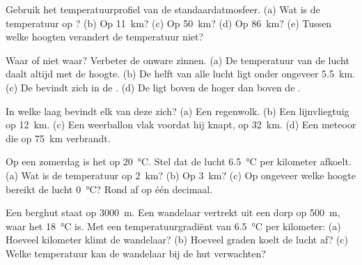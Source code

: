 \begin{exercise}[$\star$]\label{exo:g8:the-atmosphere:2}
Gebruik het temperatuurprofiel van de standaardatmosfeer. (a) Wat is de
temperatuur op ? (b) Op \qty{11}{km}? (c) Op \qty{50}{km}?
(d) Op \qty{86}{km}? (e) Tussen welke hoogten verandert de temperatuur
niet?
\end{exercise}

\begin{exercise}[$\star$]\label{exo:g8:the-atmosphere:3}
Waar of niet waar? Verbeter de onware zinnen. (a) De temperatuur van de
lucht daalt altijd met de hoogte. (b) De helft van alle lucht ligt onder
ongeveer \qty{5.5}{km}. (c) De  bevindt zich in de .
(d) De  ligt boven de  hoger dan boven de .
\end{exercise}

\begin{exercise}[$\star$]\label{exo:g8:the-atmosphere:4}
In welke laag bevindt elk van deze zich? (a) Een regenwolk. (b) Een
lijnvliegtuig op \qty{12}{km}. (c) Een weerballon vlak voordat hij knapt,
op \qty{32}{km}. (d) Een meteoor die op \qty{75}{km} verbrandt.
\end{exercise}

\begin{exercise}[$\star\star$]\label{exo:g8:the-atmosphere:5}
Op een zomerdag is het op  \qty{20}{\degreeCelsius}. Stel dat de
lucht \qty{6.5}{\degreeCelsius} per kilometer afkoelt. (a) Wat is de
temperatuur op \qty{2}{km}? (b) Op \qty{3}{km}? (c) Op ongeveer welke
hoogte bereikt de lucht \qty{0}{\degreeCelsius}? Rond af op één decimaal.
\end{exercise}

\begin{exercise}[$\star\star$]\label{exo:g8:the-atmosphere:6}
Een berghut staat op \qty{3000}{m}. Een wandelaar vertrekt uit een dorp op
\qty{500}{m}, waar het \qty{18}{\degreeCelsius} is. Met een
temperatuurgradiënt van \qty{6.5}{\degreeCelsius} per kilometer: (a) Hoeveel
kilometer klimt de wandelaar? (b) Hoeveel graden koelt de lucht af?
(c) Welke temperatuur kan de wandelaar bij de hut verwachten?
\end{exercise}


